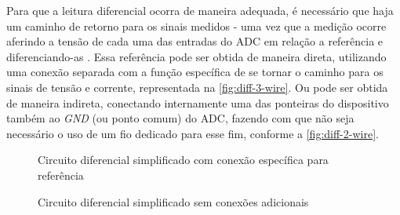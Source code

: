 Para que a leitura diferencial ocorra de maneira adequada, é necessário que haja um caminho de retorno para os sinais medidos - uma vez que a medição ocorre aferindo a tensão de cada uma das entradas do \gls{ADC} em relação a referência e diferenciando-as \cite{mediff}.
Essa referência pode ser obtida de maneira direta, utilizando uma conexão separada com a função específica de se tornar o caminho para os sinais de tensão e corrente, representada na \autoref{fig:diff-3-wire}. Ou pode ser obtida de maneira indireta, conectando internamente uma das ponteiras do dispositivo também ao \textit{GND} (ou ponto comum) do \gls{ADC}, fazendo com que não seja necessário o uso de um fio dedicado para esse fim, conforme a \autoref{fig:diff-2-wire}.

\begin{figure}[htb!]
    \caption{Circuito diferencial simplificado com conexão específica para referência}
    \vspace*{5mm}
    \label{fig:diff-3-wire}
    \fonte{}
\end{figure}

\begin{figure}[htb!]
    \caption{Circuito diferencial simplificado sem conexões adicionais}
    \vspace*{5mm}
    \label{fig:diff-2-wire}
    \fonte{}
\end{figure}

